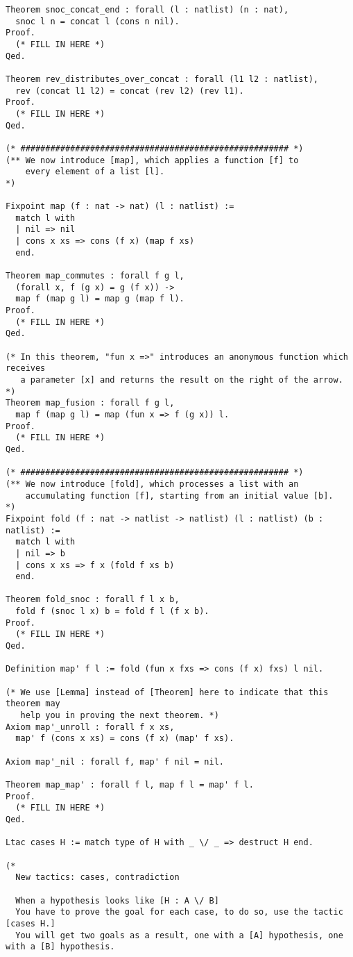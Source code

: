 \begin{verbatim}
Theorem snoc_concat_end : forall (l : natlist) (n : nat),
  snoc l n = concat l (cons n nil).
Proof.
  (* FILL IN HERE *)
Qed.

Theorem rev_distributes_over_concat : forall (l1 l2 : natlist),
  rev (concat l1 l2) = concat (rev l2) (rev l1).
Proof.
  (* FILL IN HERE *)
Qed.

(* ###################################################### *)
(** We now introduce [map], which applies a function [f] to
    every element of a list [l].
*)

Fixpoint map (f : nat -> nat) (l : natlist) :=
  match l with
  | nil => nil
  | cons x xs => cons (f x) (map f xs)
  end.

Theorem map_commutes : forall f g l,
  (forall x, f (g x) = g (f x)) ->
  map f (map g l) = map g (map f l).
Proof.
  (* FILL IN HERE *)
Qed.

(* In this theorem, "fun x =>" introduces an anonymous function which receives
   a parameter [x] and returns the result on the right of the arrow. *)
Theorem map_fusion : forall f g l,
  map f (map g l) = map (fun x => f (g x)) l.
Proof.
  (* FILL IN HERE *)
Qed.

(* ###################################################### *)
(** We now introduce [fold], which processes a list with an
    accumulating function [f], starting from an initial value [b].
*)
Fixpoint fold (f : nat -> natlist -> natlist) (l : natlist) (b : natlist) :=
  match l with
  | nil => b
  | cons x xs => f x (fold f xs b)
  end.

Theorem fold_snoc : forall f l x b,
  fold f (snoc l x) b = fold f l (f x b).
Proof.
  (* FILL IN HERE *)
Qed.

Definition map' f l := fold (fun x fxs => cons (f x) fxs) l nil.

(* We use [Lemma] instead of [Theorem] here to indicate that this theorem may
   help you in proving the next theorem. *)
Axiom map'_unroll : forall f x xs,
  map' f (cons x xs) = cons (f x) (map' f xs).

Axiom map'_nil : forall f, map' f nil = nil.

Theorem map_map' : forall f l, map f l = map' f l.
Proof.
  (* FILL IN HERE *)
Qed.

Ltac cases H := match type of H with _ \/ _ => destruct H end.

(*
  New tactics: cases, contradiction

  When a hypothesis looks like [H : A \/ B]
  You have to prove the goal for each case, to do so, use the tactic [cases H.]
  You will get two goals as a result, one with a [A] hypothesis, one with a [B] hypothesis.


\end{verbatim}

